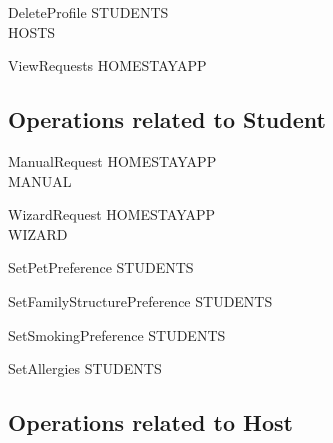 \documentclass[11pt]{article}
\begin{document}
\begin{schema}{DeleteProfile}
	\Delta STUDENTS\\
	\Delta HOSTS\\
\end{schema}

\begin{schema}{ViewRequests}
	\Xi HOMESTAYAPP\\
\end{schema}


\subsection*{Operations related to Student}

\begin{schema}{ManualRequest}
	\Delta HOMESTAYAPP\\
	\Xi MANUAL

\end{schema}

\begin{schema}{WizardRequest}
	\Delta HOMESTAYAPP\\
	\Xi WIZARD\\

\end{schema}

\begin{schema}{SetPetPreference}
	\Delta STUDENTS\\
\end{schema}

\begin{schema}{SetFamilyStructurePreference}
	\Delta STUDENTS\\
\end{schema}

\begin{schema}{SetSmokingPreference}
	\Delta STUDENTS\\
\end{schema}

\begin{schema}{SetAllergies}
	\Delta STUDENTS\\
\end{schema}


\subsection*{Operations related to Host}
\end{document}
